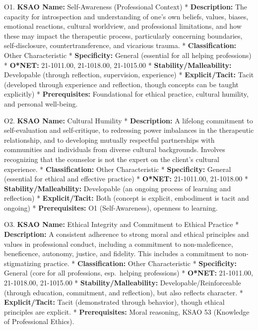 \documentclass[
  letterpaper,
  DIV=11,
  numbers=noendperiod]{scrartcl}
\begin{document}
O1. \textbf{KSAO Name:} Self-Awareness (Professional Context) *
\textbf{Description:} The capacity for introspection and understanding
of one's own beliefs, values, biases, emotional reactions, cultural
worldview, and professional limitations, and how these may impact the
therapeutic process, particularly concerning boundaries,
self-disclosure, countertransference, and vicarious trauma. *
\textbf{Classification:} Other Characteristic * \textbf{Specificity:}
General (essential for all helping professions) * \textbf{O*NET:}
21-1011.00, 21-1018.00, 21-1015.00 * \textbf{Stability/Malleability:}
Developable (through reflection, supervision, experience) *
\textbf{Explicit/Tacit:} Tacit (developed through experience and
reflection, though concepts can be taught explicitly) *
\textbf{Prerequisites:} Foundational for ethical practice, cultural
humility, and personal well-being.

O2. \textbf{KSAO Name:} Cultural Humility * \textbf{Description:} A
lifelong commitment to self-evaluation and self-critique, to redressing
power imbalances in the therapeutic relationship, and to developing
mutually respectful partnerships with communities and individuals from
diverse cultural backgrounds. Involves recognizing that the counselor is
not the expert on the client's cultural experience. *
\textbf{Classification:} Other Characteristic * \textbf{Specificity:}
General (essential for ethical and effective practice) * \textbf{O*NET:}
21-1011.00, 21-1018.00 * \textbf{Stability/Malleability:} Developable
(an ongoing process of learning and reflection) *
\textbf{Explicit/Tacit:} Both (concept is explicit, embodiment is tacit
and ongoing) * \textbf{Prerequisites:} O1 (Self-Awareness), openness to
learning.

O3. \textbf{KSAO Name:} Ethical Integrity and Commitment to Ethical
Practice * \textbf{Description:} A consistent adherence to strong moral
and ethical principles and values in professional conduct, including a
commitment to non-maleficence, beneficence, autonomy, justice, and
fidelity. This includes a commitment to non-stigmatizing practice. *
\textbf{Classification:} Other Characteristic * \textbf{Specificity:}
General (core for all professions, esp.~helping professions) *
\textbf{O*NET:} 21-1011.00, 21-1018.00, 21-1015.00 *
\textbf{Stability/Malleability:} Developable/Reinforceable (through
education, commitment, and reflection), but also reflects character. *
\textbf{Explicit/Tacit:} Tacit (demonstrated through behavior), though
ethical principles are explicit. * \textbf{Prerequisites:} Moral
reasoning, KSAO 53 (Knowledge of Professional Ethics).
\end{document}

